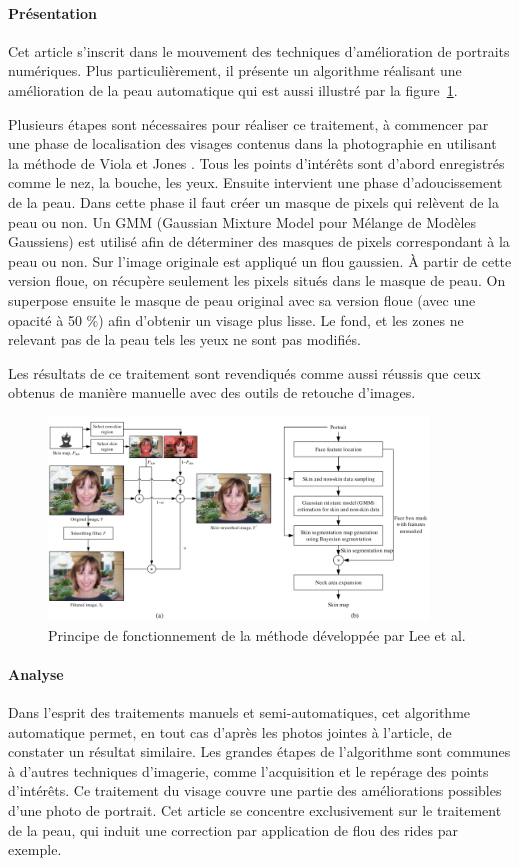 \documentclass[11pt, french,screen]{report-rd-info}
\begin{document}
\paragraph{Présentation}
Cet article s'inscrit dans le mouvement des techniques d'amélioration de portraits numériques.
Plus particulièrement, il présente un algorithme réalisant une amélioration de la peau automatique qui est aussi illustré par la figure~\ref{fig:FonctionnementLee}.

Plusieurs étapes sont nécessaires pour réaliser ce traitement, à commencer par une phase de localisation des visages contenus dans la photographie en utilisant la méthode de Viola et Jones \cite{Viola2004}.
Tous les points d'intérêts sont d'abord enregistrés comme le nez, la bouche, les yeux.
Ensuite intervient une phase d'adoucissement de la peau.
Dans cette phase il faut créer un masque de pixels qui relèvent de la peau ou non.
Un GMM (Gaussian Mixture Model pour Mélange de Modèles Gaussiens) est utilisé afin de déterminer des masques de pixels correspondant à la peau ou non.
Sur l’image originale est appliqué un flou gaussien. À partir de cette version floue, on récupère seulement les pixels situés dans le masque de peau. On superpose ensuite le masque de peau original avec sa version floue (avec une opacité à 50 \%) afin d’obtenir un visage plus lisse. Le fond, et les zones ne relevant pas de la peau tels les yeux ne sont pas modifiés.

Les résultats de ce traitement sont revendiqués comme aussi réussis que ceux obtenus de manière manuelle avec des outils de retouche d'images.
\begin{figure}
	\centering
\includegraphics[width=0.9\textwidth]{Images/ea_algo_smoothing}
	\caption{Principe de fonctionnement de la méthode développée par Lee et al. \cite{Lee}}
	\label{fig:FonctionnementLee}
\end{figure}
\paragraph{Analyse}
Dans l'esprit des traitements manuels et semi-automatiques, cet algorithme automatique permet, en tout cas d'après les photos jointes à l'article, de constater un résultat similaire.
Les grandes étapes de l'algorithme sont communes à d'autres techniques d'imagerie, comme l'acquisition et le repérage des points d'intérêts.
Ce traitement du visage couvre une partie des améliorations possibles d'une photo de portrait. Cet article se concentre exclusivement sur le traitement de la peau, qui induit une correction par application de flou des rides par exemple.
\end{document}
